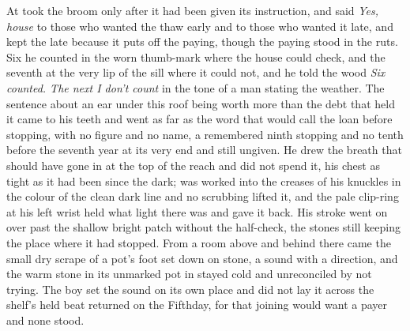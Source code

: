 \scenebreak

At   took the broom only after it had been given its instruction, and said \emph{Yes, house} to those who wanted the thaw early and to those who wanted it late, and kept the late because it puts off the paying, though the paying stood in the ruts. Six he counted in the worn thumb-mark where the house could check, and the seventh at the very lip of the sill where it could not, and he told the wood \emph{Six counted. The next I don't count} in the tone of a man stating the weather. The sentence about an ear under this roof being worth more than the debt that held it came to his teeth and went as far as the word that would call the loan before stopping, with no figure and no name, a remembered ninth stopping and no tenth before the seventh year at its very end and still ungiven. He drew the breath that should have gone in at the top of the reach and did not spend it, his chest as tight as it had been since the dark;  was worked into the creases of his knuckles in the colour of the clean dark line and no scrubbing lifted it, and the pale clip-ring at his left wrist held what light there was and gave it back. His stroke went on over  past the shallow bright patch without the half-check, the stones still keeping the place where it had stopped. From a room above and behind there came the small dry scrape of a pot's foot set down on stone, a sound with a direction, and the warm stone in its unmarked pot in  stayed cold and unreconciled by not trying. The boy set the sound on its own place and did not lay it across the shelf's held beat returned on the Fifthday, for that joining would want a payer and none stood.

